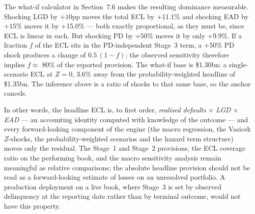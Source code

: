 \documentclass[11pt,a4paper]{article}
\begin{document}
The what-if calculator in Section~7.6 makes the resulting dominance measurable. Shocking LGD by $+10$pp moves the total ECL by +11.1\% and shocking EAD by $+15\%$ moves it by +15.0\% --- both exactly proportional, as they must be, since ECL is linear in each. But shocking PD by $+50\%$ moves it by only +9.9\%. If a fraction $f$ of the ECL sits in the PD-independent Stage~3 term, a $+50\%$ PD shock produces a change of $0.5\,(1-f)$; the observed sensitivity therefore implies $f \approx$ 80\% of the reported provision. The what-if base is \$1.30bn: a single-scenario ECL at $Z=0$, 3.6\% away from the probability-weighted headline of \$1.35bn. The inference above is a ratio of shocks to that same base, so the anchor cancels.

In other words, the headline ECL is, to first order, \emph{realised defaults} $\times$ \emph{LGD} $\times$ \emph{EAD} --- an accounting identity computed with knowledge of the outcome --- and every forward-looking component of the engine (the macro regression, the Vasicek $Z$-shocks, the probability-weighted scenarios and the hazard term structure) moves only the residual. The Stage~1 and Stage~2 provisions, the ECL coverage ratio on the performing book, and the macro sensitivity analysis remain meaningful as relative comparisons; the absolute headline provision should not be read as a forward-looking estimate of losses on an unresolved portfolio. A production deployment on a live book, where Stage~3 is set by observed delinquency at the reporting date rather than by terminal outcome, would not have this property.
\end{document}

